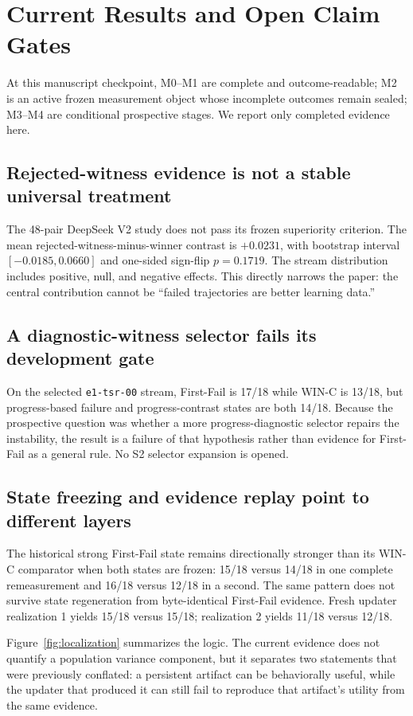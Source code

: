 \section{Current Results and Open Claim Gates}
\label{sec:results}

At this manuscript checkpoint, M0--M1 are complete and outcome-readable; M2 is an active frozen measurement object whose incomplete outcomes remain sealed; M3--M4 are conditional prospective stages. We report only completed evidence here.

\subsection{Rejected-witness evidence is not a stable universal treatment}
The 48-pair DeepSeek V2 study does not pass its frozen superiority criterion. The mean rejected-witness-minus-winner contrast is $+0.0231$, with bootstrap interval $[-0.0185,0.0660]$ and one-sided sign-flip $p=0.1719$. The stream distribution includes positive, null, and negative effects. This directly narrows the paper: the central contribution cannot be ``failed trajectories are better learning data.''

\subsection{A diagnostic-witness selector fails its development gate}
On the selected \texttt{e1-tsr-00} stream, First-Fail is 17/18 while WIN-C is 13/18, but progress-based failure and progress-contrast states are both 14/18. Because the prospective question was whether a more progress-diagnostic selector repairs the instability, the result is a failure of that hypothesis rather than evidence for First-Fail as a general rule. No S2 selector expansion is opened.

\subsection{State freezing and evidence replay point to different layers}
The historical strong First-Fail state remains directionally stronger than its WIN-C comparator when both states are frozen: 15/18 versus 14/18 in one complete remeasurement and 16/18 versus 12/18 in a second. The same pattern does not survive state regeneration from byte-identical First-Fail evidence. Fresh updater realization 1 yields 15/18 versus 15/18; realization 2 yields 11/18 versus 12/18.

Figure~\ref{fig:localization} summarizes the logic. The current evidence does not quantify a population variance component, but it separates two statements that were previously conflated: a persistent artifact can be behaviorally useful, while the updater that produced it can still fail to reproduce that artifact's utility from the same evidence.

